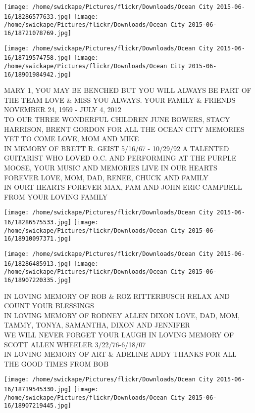 \documentclass[10pt,letterpaper]{article}
\begin{document}
\texttt{[image: /home/swickape/Pictures/flickr/Downloads/Ocean City 2015-06-16/18286577633.jpg]}
\texttt{[image: /home/swickape/Pictures/flickr/Downloads/Ocean City 2015-06-16/18721078769.jpg]}

\texttt{[image: /home/swickape/Pictures/flickr/Downloads/Ocean City 2015-06-16/18719574758.jpg]}
\texttt{[image: /home/swickape/Pictures/flickr/Downloads/Ocean City 2015-06-16/18901984942.jpg]}

MARY 1, YOU MAY BE BENCHED BUT YOU WILL ALWAYS BE PART OF THE TEAM LOVE \& MISS YOU ALWAYS.  YOUR FAMILY \& FRIENDS NOVEMBER 24, 1959 {-} JULY 4, 2012\\
TO OUR THREE WONDERFUL CHILDREN JUNE BOWERS, STACY HARRISON, BRENT GORDON FOR ALL THE OCEAN CITY MEMORIES YET TO COME LOVE, MOM AND MIKE\\
IN MEMORY OF BRETT R. GEIST 5/16/67 {-} 10/29/92 A TALENTED GUITARIST WHO LOVED O.C. AND PERFORMING AT THE PURPLE MOOSE, YOUR MUSIC AND MEMORIES LIVE IN OUR HEARTS FOREVER LOVE, MOM, DAD, RENEE, CHUCK AND FAMILY\\
IN OURT HEARTS FOREVER MAX, PAM AND JOHN ERIC CAMPBELL FROM YOUR LOVING FAMILY\\
\pagebreak

\texttt{[image: /home/swickape/Pictures/flickr/Downloads/Ocean City 2015-06-16/18286575533.jpg]}
\texttt{[image: /home/swickape/Pictures/flickr/Downloads/Ocean City 2015-06-16/18910097371.jpg]}

\texttt{[image: /home/swickape/Pictures/flickr/Downloads/Ocean City 2015-06-16/18286485913.jpg]}
\texttt{[image: /home/swickape/Pictures/flickr/Downloads/Ocean City 2015-06-16/18907220335.jpg]}

IN LOVING MEMORY OF ROB \& ROZ RITTERBUSCH RELAX AND COUNT YOUR BLESSINGS\\
IN LOVING MEMORY OF RODNEY ALLEN DIXON LOVE, DAD, MOM, TAMMY, TONYA, SAMANTHA, DIXON AND JENNIFER\\
WE WILL NEVER FORGET YOUR LAUGH IN LOVING MEMORY OF SCOTT ALLEN WHEELER 3/22/76{-}6/18/07\\
IN LOVING MEMORY OF ART \& ADELINE ADDY THANKS FOR ALL THE GOOD TIMES FROM BOB\\
\pagebreak

\texttt{[image: /home/swickape/Pictures/flickr/Downloads/Ocean City 2015-06-16/18719545330.jpg]}
\texttt{[image: /home/swickape/Pictures/flickr/Downloads/Ocean City 2015-06-16/18907219445.jpg]}
\end{document}
